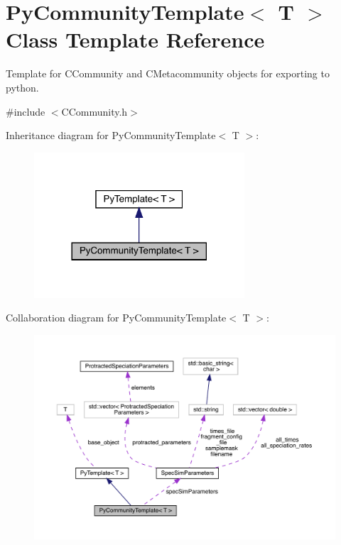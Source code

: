 \hypertarget{class_py_community_template}{}\section{Py\+Community\+Template$<$ T $>$ Class Template Reference}
\label{class_py_community_template}


Template for C\+Community and C\+Metacommunity objects for exporting to python.  




{\ttfamily \#include $<$C\+Community.\+h$>$}



Inheritance diagram for Py\+Community\+Template$<$ T $>$\+:\nopagebreak
\begin{figure}[H]
\begin{center}
\leavevmode
\includegraphics[width=222pt]{class_py_community_template__inherit__graph}
\end{center}
\end{figure}


Collaboration diagram for Py\+Community\+Template$<$ T $>$\+:\nopagebreak
\begin{figure}[H]
\begin{center}
\leavevmode
\includegraphics[width=350pt]{class_py_community_template__coll__graph}
\end{center}
\end{figure}
